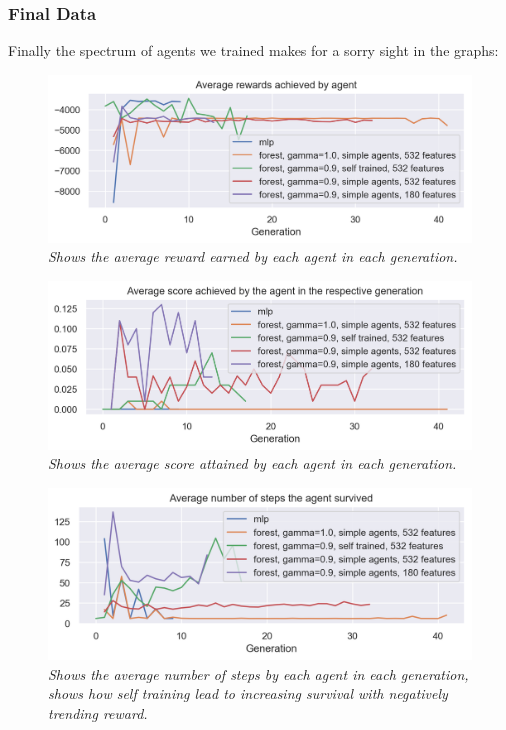 \subsubsection{Final Data}
Finally the spectrum of agents we trained makes for a sorry sight in the graphs:
\begin{figure}[!h]
\centering
	\includegraphics[width=\linewidth]{images/allrew.png}
	\caption{\textit{Shows the average reward earned by each agent in each generation.}}
	\label{allrew}
\end{figure}
\begin{figure}[!h]
\centering
	\includegraphics[width=\linewidth]{images/allsco.png}
	\caption{\textit{Shows the average score attained by each agent in each generation.}}
	\label{allsco}
\end{figure}
\begin{figure}[!h]
\centering
	\includegraphics[width=\linewidth]{images/allste.png}
	\caption{\textit{Shows the average number of steps by each agent in each generation, shows how self training lead to increasing survival with negatively trending reward.}}
	\label{allsco}
\end{figure}

